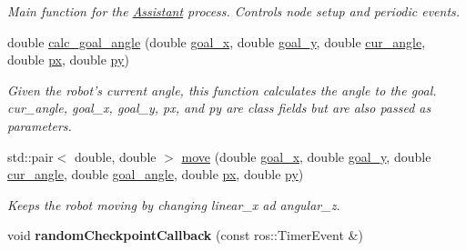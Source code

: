 \begin{DoxyCompactItemize}
\begin{DoxyCompactList}\small\item\em Main function for the \hyperlink{classAssistant}{Assistant} process. Controls node setup and periodic events. \end{DoxyCompactList}\item 
double \hyperlink{classAssistant_a8fce345025f32bcd0e45d83960d4b3f7}{calc\-\_\-goal\-\_\-angle} (double \hyperlink{classAssistant_a1a1f1fe48d0eb6a6a39b7fbdb2ef6641}{goal\-\_\-x}, double \hyperlink{classAssistant_a1b6ce5d7c3124140be8d351c847fe91c}{goal\-\_\-y}, double \hyperlink{classAssistant_a451a20f551c43d0b6810c8208fe84773}{cur\-\_\-angle}, double \hyperlink{classAssistant_a694fdaa5fb378340c42b7f75716cd1ce}{px}, double \hyperlink{classAssistant_ae092b444c226b5ffbdf454ad24f630d6}{py})
\begin{DoxyCompactList}\small\item\em Given the robot's current angle, this function calculates the angle to the goal. cur\-\_\-angle, goal\-\_\-x, goal\-\_\-y, px, and py are class fields but are also passed as parameters. \end{DoxyCompactList}\item 
std\-::pair$<$ double, double $>$ \hyperlink{classAssistant_ac420c9d5551f0ef6925d9a58a5b4854a}{move} (double \hyperlink{classAssistant_a1a1f1fe48d0eb6a6a39b7fbdb2ef6641}{goal\-\_\-x}, double \hyperlink{classAssistant_a1b6ce5d7c3124140be8d351c847fe91c}{goal\-\_\-y}, double \hyperlink{classAssistant_a451a20f551c43d0b6810c8208fe84773}{cur\-\_\-angle}, double \hyperlink{classAssistant_ae4468e02db193f0ffa0ca17a249f802d}{goal\-\_\-angle}, double \hyperlink{classAssistant_a694fdaa5fb378340c42b7f75716cd1ce}{px}, double \hyperlink{classAssistant_ae092b444c226b5ffbdf454ad24f630d6}{py})
\begin{DoxyCompactList}\small\item\em Keeps the robot moving by changing linear\-\_\-x ad angular\-\_\-z. \end{DoxyCompactList}\item 
\hypertarget{classAssistant_a320ca71cccf4964b341820db82b4b604}{void {\bfseries random\-Checkpoint\-Callback} (const ros\-::\-Timer\-Event \&)}\label{classAssistant_a320ca71cccf4964b341820db82b4b604}


\end{DoxyCompactItemize}
